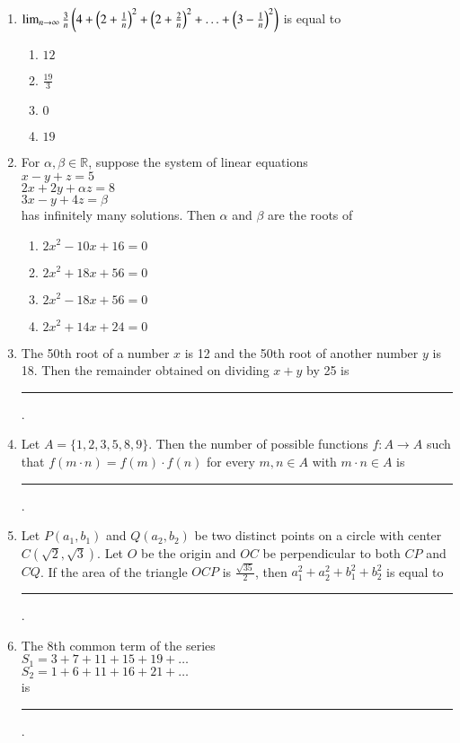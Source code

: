\documentclass[journal,12pt,onecolumn]{IEEEtran}
\theoremstyle{remark}
\begin{document}
\begin{enumerate}
    \item $\lim_{n \to \infty} \frac{3}{n}\left(4+\left(2+\frac{1}{n}\right)^2+\left(2+\frac{2}{n}\right)^2 + \ldots + \left(3-\frac{1}{n}\right)^2\right)$ is equal to
    \begin{enumerate}
        \item $12$
        \item $\frac{19}{3}$
        \item $0$
        \item $19$
    \end{enumerate}

    \item For $\alpha, \beta \in \mathbb{R}$, suppose the system of linear equations\\$x - y + z = 5$\\ $2x + 2y + \alpha z = 8$\\ $3x - y + 4z = \beta$\\ has infinitely many solutions. Then $\alpha$ and $\beta$ are the roots of
    \begin{enumerate}
        \item $2x^2 - 10x + 16 = 0$
        \item $2x^2 + 18x + 56 = 0$
        \item $2x^2 - 18x + 56 = 0$
        \item $2x^2 + 14x + 24 = 0$
    \end{enumerate}
    
    \item The 50th root of a number $x$ is 12 and the 50th root of another number $y$ is 18. Then the remainder obtained on dividing $x + y$ by 25 is \rule{2.5cm}{0.4pt}.
    
    \item Let $A = \{1, 2, 3, 5, 8, 9\}$. Then the number of possible functions $f: A \to A$ such that $f(m \cdot n) = f(m) \cdot f(n)$ for every $m, n \in A$ with $m \cdot n \in A$ is \rule{2.5cm}{0.4pt}.
    
    \item Let $P(a_1, b_1)$ and $Q(a_2, b_2)$ be two distinct points on a circle with center $C(\sqrt{2}, \sqrt{3})$. Let $O$ be the origin and $OC$ be perpendicular to both $CP$ and $CQ$. If the area of the triangle $OCP$ is $\frac{\sqrt{35}}{2}$, then $a_1^2 + a_2^2 + b_1^2 + b_2^2$ is equal to \rule{2.5cm}{0.4pt}.
    
    \item The 8th common term of the series\\$S_1 = 3 + 7 + 11 + 15 + 19 + \dots$\\$S_2 = 1 + 6 + 11 + 16 + 21 + \dots$\\is \rule{2.5cm}{0.4pt}.
    

\end{enumerate}
\end{document}
